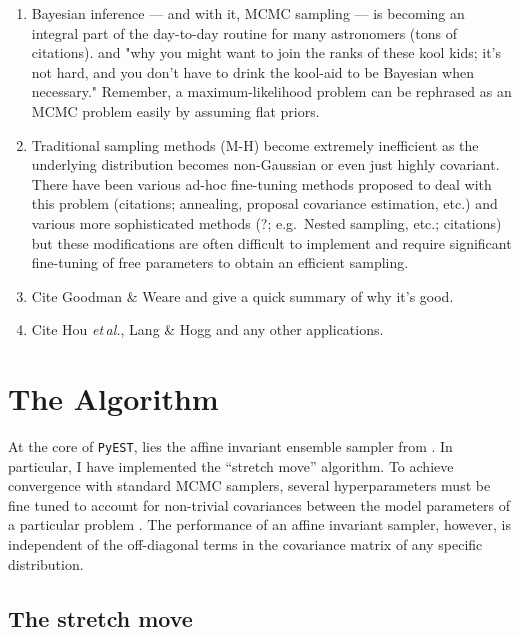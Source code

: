 \documentclass[12pt,preprint]{aastex}
\newcommand{\project}[1]{\texttt{#1}}
\newcommand{\this}{\project{PyEST}}
\newcommand{\foreign}[1]{\emph{#1}}
\newcommand{\etal}{\foreign{et\,al.}}
\begin{document}
\begin{enumerate}

    \item Bayesian inference  --- and with it, MCMC sampling --- is becoming an
        integral part of the day-to-day routine for many astronomers (tons of
        citations). and "why you might want to join the ranks of these kool kids;
        it's not hard, and you don't have to drink the kool-aid to be Bayesian
        when necessary." Remember, a maximum-likelihood problem can be rephrased
        as an MCMC problem easily by assuming flat priors.

    \item Traditional sampling methods (M-H) become extremely inefficient as the
        underlying distribution becomes non-Gaussian or even just highly covariant.
        There have been various ad-hoc fine-tuning methods proposed to deal with
        this problem (citations; annealing, proposal covariance estimation, etc.)
        and various more sophisticated methods (?; e.g.~Nested sampling, etc.;
        citations) but these modifications are often difficult to implement and
        require significant fine-tuning of free parameters to obtain an efficient
        sampling.

    \item Cite Goodman \& Weare and give a quick summary of why it's good.

    \item Cite Hou \etal, Lang \& Hogg and any other applications.

\end{enumerate}

\section{The Algorithm}

\citet{Hou:2011}

At the core of \this, lies the affine invariant ensemble sampler from
\citep{Goodman:2010}.  In particular, I have implemented the ``stretch move''
algorithm.  To achieve convergence with standard MCMC samplers, several
hyperparameters must be fine tuned to account for non-trivial covariances between
the model parameters of a particular problem \citep[e.g.][]{Dunkley:2005}.
The performance of an affine invariant sampler, however, is independent of the
off-diagonal terms in the covariance matrix of any specific distribution.

\subsection{The stretch move}
\end{document}
